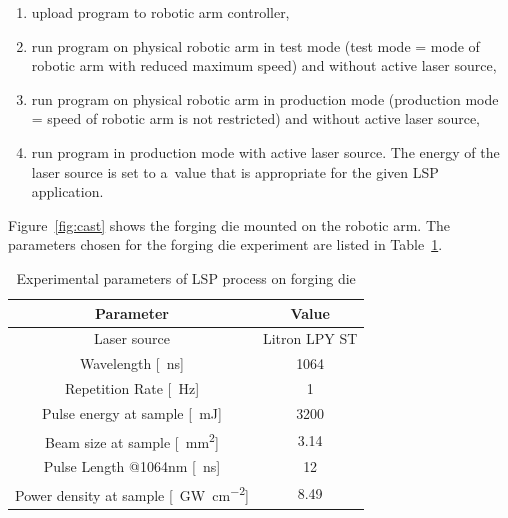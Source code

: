 \begin{enumerate}
    
\item upload program to robotic arm controller,

\item run program on physical robotic arm in test mode (test mode = mode of robotic arm with reduced maximum speed) and without active laser source,

\item run program on physical robotic arm in production mode (production mode = speed of robotic arm is not restricted) and without active laser source,

\item run program in production mode with active laser source. The energy of the laser source is set to a~value that is appropriate for the given LSP application. 

\end{enumerate}
Figure~\ref{fig:cast} shows the forging die mounted on the robotic arm. The parameters chosen for the forging die experiment are listed in Table~\ref{experimental_forging}. 

\begin{table}[h!]
\centering
    \begin{threeparttable}
        \begin{tabular}{|c | c|} 
        \hline
            \textbf{Parameter} & \textbf{Value} \\ [0.5ex] 
        \hline
        Laser source & Litron LPY ST  \\
        \hline
        Wavelength [\SI{}{\nano\second}] & 1064 \\
        \hline
        Repetition Rate [\SI{}{\hertz}] & 1  \\ 
        \hline
            Pulse energy at sample [\SI{}{\milli\joule}] & 3200 \\
        \hline
            Beam size at sample [\SI{}{\mm\squared}] & 3.14 \\
        \hline
            Pulse Length @1064nm [\SI{}{\nano\second}] & 12 \\
        \hline
            Power density at sample [\SI{}{\giga\watt\per\cm\squared}] & 8.49 \\

        \hline
        \end{tabular}

        \caption{Experimental parameters of LSP process on forging die}
        \label{experimental_forging}
    \end{threeparttable}
\end{table}

